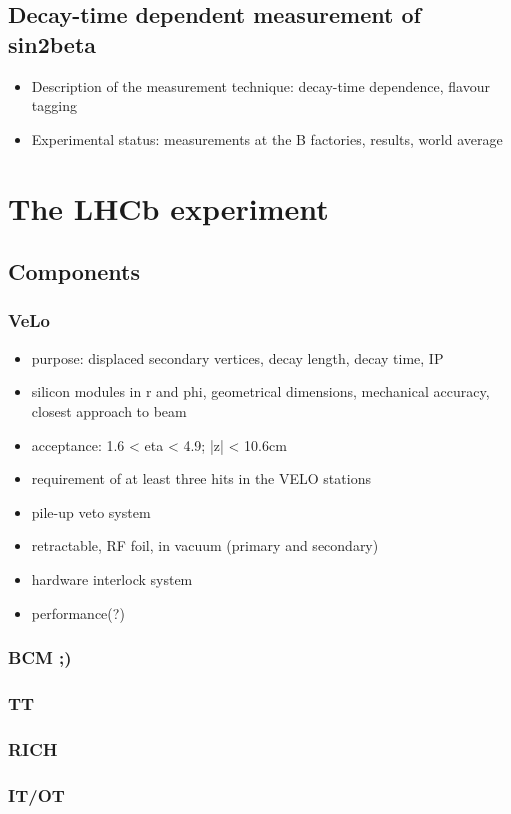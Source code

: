 \section{Decay-time dependent measurement of sin2beta}
\begin{itemize}
  \item Description of the measurement technique: decay-time dependence, flavour tagging
  \item Experimental status: measurements at the B factories, results, world average
\end{itemize}

\chapter{The LHCb experiment}
\section{Components}
\subsection{VeLo}
\begin{itemize}
  \item purpose: displaced secondary vertices, decay length, decay time, IP
  \item silicon modules in r and phi, geometrical dimensions, mechanical accuracy, closest approach to beam
  \item acceptance: 1.6 < eta < 4.9; |z| < 10.6cm
  \item requirement of at least three hits in the VELO stations
  \item pile-up veto system
  \item retractable, RF foil, in vacuum (primary and secondary)
  \item hardware interlock system
  \item performance(?)
\end{itemize}
\subsection{BCM ;)}
\subsection{TT}
\subsection{RICH}
\subsection{IT/OT}
